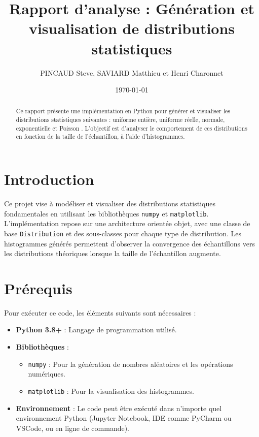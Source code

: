 \documentclass{article}
\title{Rapport d'analyse : Génération et visualisation de distributions statistiques}
\author{PINCAUD Steve, SAVIARD Matthieu et Henri Charonnet}
\date{\today}
\begin{document}
\maketitle

\begin{abstract}  
Ce rapport présente une implémentation en Python pour générer et visualiser les distributions statistiques suivantes : uniforme entière, uniforme réelle, normale, exponentielle et Poisson . L'objectif est d'analyser le comportement de ces distributions en fonction de la taille de l'échantillon, à l'aide d'histogrammes.  
\end{abstract}

\tableofcontents

\section{Introduction}  
Ce projet vise à modéliser et visualiser des distributions statistiques fondamentales en utilisant les bibliothèques \texttt{numpy} et \texttt{matplotlib}. L'implémentation repose sur une architecture orientée objet, avec une classe de base \texttt{Distribution} et des sous-classes pour chaque type de distribution. Les histogrammes générés permettent d'observer la convergence des échantillons vers les distributions théoriques lorsque la taille de l'échantillon augmente.

\section{Prérequis}  
Pour exécuter ce code, les éléments suivants sont nécessaires :  
\begin{itemize}  
    \item \textbf{Python 3.8+} : Langage de programmation utilisé.  
    \item \textbf{Bibliothèques} :  
    \begin{itemize}  
        \item \texttt{numpy} : Pour la génération de nombres aléatoires et les opérations numériques.  
        \item \texttt{matplotlib} : Pour la visualisation des histogrammes.  
    \end{itemize}  
    \item \textbf{Environnement} : Le code peut être exécuté dans n'importe quel environnement Python (Jupyter Notebook, IDE comme PyCharm ou VSCode, ou en ligne de commande).  
\end{itemize}
\end{document}
